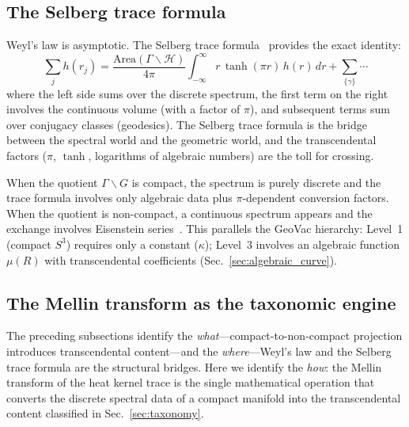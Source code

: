 \documentclass[aps,pra,twocolumn,superscriptaddress,longbibliography]{revtex4-2}
\begin{document}
\subsection{The Selberg trace formula}

Weyl's law is asymptotic.  The Selberg trace
formula~\cite{selberg1956} provides the exact identity:
\begin{equation}
  \sum_j h(r_j)
  = \frac{\mathrm{Area}(\Gamma \backslash \mathcal{H})}{4\pi}
    \int_{-\infty}^{\infty} r\,\tanh(\pi r)\,h(r)\,dr
    + \sum_{\{\gamma\}} \cdots
  \label{eq:selberg}
\end{equation}
where the left side sums over the discrete spectrum, the first
term on the right involves the continuous volume (with a factor
of $\pi$), and subsequent terms sum over conjugacy classes
(geodesics).  The Selberg trace formula is the bridge between
the spectral world and the geometric world, and the
transcendental factors ($\pi$, $\tanh$, logarithms of
algebraic numbers) are the toll for crossing.

When the quotient $\Gamma \backslash G$ is compact, the spectrum
is purely discrete and the trace formula involves only algebraic
data plus $\pi$-dependent conversion factors.  When the quotient
is non-compact, a continuous spectrum appears and the exchange
involves Eisenstein series~\cite{selberg1956}.  This parallels the
GeoVac hierarchy: Level~1 (compact $S^3$) requires only a constant
($\kappa$); Level~3 involves an algebraic function $\mu(R)$ with
transcendental coefficients (Sec.~\ref{sec:algebraic_curve}).

\subsection{The Mellin transform as the taxonomic engine}
\label{sec:mellin}

The preceding subsections identify the \emph{what}---compact-to-non-compact
projection introduces transcendental content---and the \emph{where}---Weyl's
law and the Selberg trace formula are the structural bridges.  Here we
identify the \emph{how}: the Mellin transform of the heat kernel trace is
the single mathematical operation that converts the discrete spectral data
of a compact manifold into the transcendental content classified in
Sec.~\ref{sec:taxonomy}.
\end{document}

